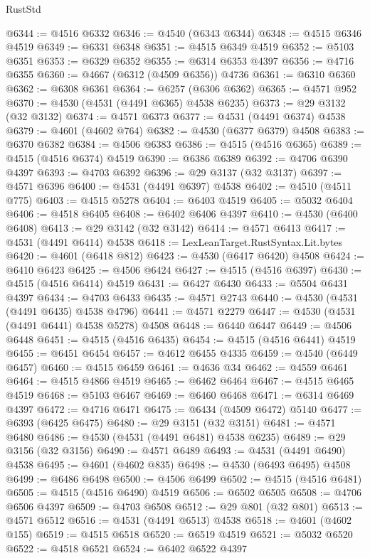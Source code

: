 \begin{lexlean}{RustStd}
\begin{coremodule}
{\begin{coremodule}
{{{{{{{{{{{{{{{{{{{{{{{{{{{{{{{{{{{{{{{{{{{{{{{{{{{{{{{@6344 := @4516 @6332
@6346 := @4540 (@6343 @6344)
@6348 := @4515 @6346 @4519
@6349 := @6331 @6348
@6351 := @4515 @6349 @4519
@6352 := @5103 @6351
@6353 := @6329 @6352
@6355 := @6314 @6353 @4397
@6356 := @4716 @6355
@6360 := @4667 (@6312 (@4509 @6356)) @4736
@6361 := @6310 @6360
@6362 := @6308 @6361
@6364 := @6257 (@6306 @6362)
@6365 := @4571 @952
@6370 := @4530 (@4531 (@4491 @6365) @4538 @6235)
@6373 := @29 @3132 (@32 @3132)
@6374 := @4571 @6373
@6377 := @4531 (@4491 @6374) @4538
@6379 := @4601 (@4602 @764)
@6382 := @4530 (@6377 @6379) @4508
@6383 := @6370 @6382
@6384 := @4506 @6383
@6386 := @4515 (@4516 @6365)
@6389 := @4515 (@4516 @6374) @4519
@6390 := @6386 @6389
@6392 := @4706 @6390 @4397
@6393 := @4703 @6392
@6396 := @29 @3137 (@32 @3137)
@6397 := @4571 @6396
@6400 := @4531 (@4491 @6397) @4538
@6402 := @4510 (@4511 @775)
@6403 := @4515 @5278
@6404 := @6403 @4519
@6405 := @5032 @6404
@6406 := @4518 @6405
@6408 := @6402 @6406 @4397
@6410 := @4530 (@6400 @6408)
@6413 := @29 @3142 (@32 @3142)
@6414 := @4571 @6413
@6417 := @4531 (@4491 @6414) @4538
@6418 := LexLeanTarget.RustSyntax.Lit.bytes
@6420 := @4601 (@6418 @812)
@6423 := @4530 (@6417 @6420) @4508
@6424 := @6410 @6423
@6425 := @4506 @6424
@6427 := @4515 (@4516 @6397)
@6430 := @4515 (@4516 @6414) @4519
@6431 := @6427 @6430
@6433 := @5504 @6431 @4397
@6434 := @4703 @6433
@6435 := @4571 @2743
@6440 := @4530 (@4531 (@4491 @6435) @4538 @4796)
@6441 := @4571 @2279
@6447 := @4530 (@4531 (@4491 @6441) @4538 @5278) @4508
@6448 := @6440 @6447
@6449 := @4506 @6448
@6451 := @4515 (@4516 @6435)
@6454 := @4515 (@4516 @6441) @4519
@6455 := @6451 @6454
@6457 := @4612 @6455 @4335
@6459 := @4540 (@6449 @6457)
@6460 := @4515 @6459
@6461 := @4636 @34
@6462 := @4559 @6461
@6464 := @4515 @4866 @4519
@6465 := @6462 @6464
@6467 := @4515 @6465 @4519
@6468 := @5103 @6467
@6469 := @6460 @6468
@6471 := @6314 @6469 @4397
@6472 := @4716 @6471
@6475 := @6434 (@4509 @6472) @5140
@6477 := @6393 (@6425 @6475)
@6480 := @29 @3151 (@32 @3151)
@6481 := @4571 @6480
@6486 := @4530 (@4531 (@4491 @6481) @4538 @6235)
@6489 := @29 @3156 (@32 @3156)
@6490 := @4571 @6489
@6493 := @4531 (@4491 @6490) @4538
@6495 := @4601 (@4602 @835)
@6498 := @4530 (@6493 @6495) @4508
@6499 := @6486 @6498
@6500 := @4506 @6499
@6502 := @4515 (@4516 @6481)
@6505 := @4515 (@4516 @6490) @4519
@6506 := @6502 @6505
@6508 := @4706 @6506 @4397
@6509 := @4703 @6508
@6512 := @29 @801 (@32 @801)
@6513 := @4571 @6512
@6516 := @4531 (@4491 @6513) @4538
@6518 := @4601 (@4602 @155)
@6519 := @4515 @6518
@6520 := @6519 @4519
@6521 := @5032 @6520
@6522 := @4518 @6521
@6524 := @6402 @6522 @4397
}}}}}}}}}}}}}}}}}}}}}}}}}}}}}}}}}}}}}}}}}}}}}}}}}}}}}}}
\end{coremodule}}
\end{coremodule}
\end{lexlean}

